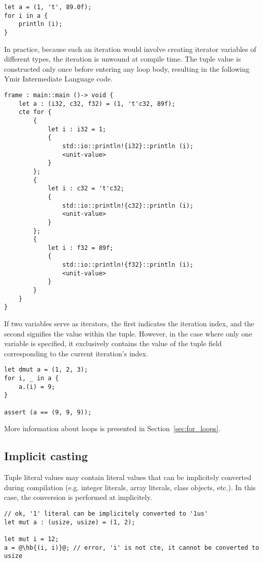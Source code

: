\begin{lstlisting}[style=coloredverbatim]
let a = (1, 't', 89.0f);
for i in a {
    println (i);
}
\end{lstlisting}

In practice, because such an iteration would involve creating iterator variables
of different types, the iteration is unwound at compile time. The tuple value is
constructed only once before entering any loop body, resulting in the following
Ymir Intermediate Language code.

\begin{lstlisting}[style=intermediateVerb]
frame : main::main ()-> void {
    let a : (i32, c32, f32) = (1, 't'c32, 89f);
    cte for {
        {
            let i : i32 = 1;
            {
                std::io::println!{i32}::println (i);
                <unit-value>
            }
        };
        {
            let i : c32 = 't'c32;
            {
                std::io::println!{c32}::println (i);
                <unit-value>
            }
        };
        {
            let i : f32 = 89f;
            {
                std::io::println!{f32}::println (i);
                <unit-value>
            }
        }
    }
}
\end{lstlisting}

If two variables serve as iterators, the first indicates the iteration index,
and the second signifies the value within the tuple. However, in the case where
only one variable is specified, it exclusively contains the value of the tuple
field corresponding to the current iteration's index.

\begin{lstlisting}[style=coloredverbatim]
let dmut a = (1, 2, 3);
for i, _ in a {
    a.(i) = 9;
}

assert (a == (9, 9, 9));
\end{lstlisting}

More information about  loops is presented in Section~\ref{sec:for_loops}.

\subsection {Implicit casting}

Tuple literal values may contain literal values that can be implicitely
converted during compilation (e.g. integer literals, array literals, class
objects, etc.). In this case, the conversion is performed at 
implicitely.

\begin{lstlisting}[style=coloredverbatim, escapechar=@]
// ok, '1' literal can be implicitely converted to '1us'
let mut a : (usize, usize) = (1, 2);

let mut i = 12;
a = @\hb{(i, i)}@; // error, 'i' is not cte, it cannot be converted to usize
\end{lstlisting}

